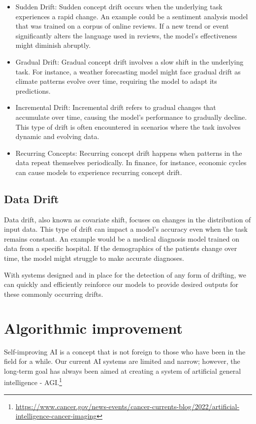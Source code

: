 \documentclass[
]{book}
\begin{document}
\begin{itemize}
\item
  Sudden Drift: Sudden concept drift occurs when the underlying task experiences a rapid change. An example could be a sentiment analysis model that was trained on a corpus of online reviews. If a new trend or event significantly alters the language used in reviews, the model's effectiveness might diminish abruptly.
\item
  Gradual Drift: Gradual concept drift involves a slow shift in the underlying task. For instance, a weather forecasting model might face gradual drift as climate patterns evolve over time, requiring the model to adapt its predictions.
\item
  Incremental Drift: Incremental drift refers to gradual changes that accumulate over time, causing the
  model's performance to gradually decline. This type of drift is often encountered in scenarios where the task involves dynamic and evolving data.
\item
  Recurring Concepts: Recurring concept drift happens when patterns in the data repeat themselves periodically. In finance, for instance, economic cycles can cause models to experience recurring concept drift.
\end{itemize}

\hypertarget{data-drift}{%
\subsection{Data Drift}\label{data-drift}}

Data drift, also known as covariate shift, focuses on changes in the distribution of input data. This type of drift can impact a model's accuracy even when the task remains constant. An example would be a medical diagnosis model trained on data from a specific hospital. If the demographics of the patients change over time, the model might struggle to make accurate diagnoses.

With systems designed and in place for the detection of any form of drifting, we can quickly and efficiently reinforce our models to provide desired outputs for these commonly occurring drifts.

\hypertarget{algorithmic-improvement}{%
\section{Algorithmic improvement}\label{algorithmic-improvement}}

Self-improving AI is a concept that is not foreign to those who have been in the field for a while. Our current AI systems are limited and narrow; however, the long-term goal has always been aimed at creating a system of artificial general intelligence - AGI.\footnote{\url{https://www.cancer.gov/news-events/cancer-currents-blog/2022/artificial-intelligence-cancer-imaging}}
\end{document}
